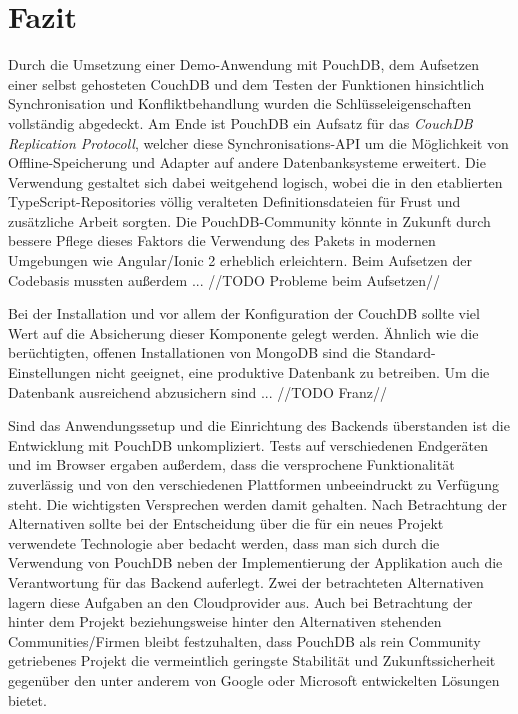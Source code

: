 \chapter{Fazit}
\label{Fazit}
Durch die Umsetzung einer Demo-Anwendung mit PouchDB, dem Aufsetzen einer selbst gehosteten CouchDB und dem Testen der Funktionen hinsichtlich Synchronisation und Konfliktbehandlung wurden die Schlüsseleigenschaften vollständig abgedeckt. Am Ende ist PouchDB ein Aufsatz für das \emph{CouchDB Replication Protocoll}, welcher diese Synchronisations-API um die Möglichkeit von Offline-Speicherung und Adapter auf andere Datenbanksysteme erweitert. Die Verwendung gestaltet sich dabei weitgehend logisch, wobei die in den etablierten TypeScript-Repositories völlig veralteten Definitionsdateien für Frust und zusätzliche Arbeit sorgten. Die PouchDB-Community könnte in Zukunft durch bessere Pflege dieses Faktors die Verwendung des Pakets in modernen Umgebungen wie Angular/Ionic 2 erheblich erleichtern. Beim Aufsetzen der Codebasis mussten außerdem ... //TODO Probleme beim Aufsetzen//

Bei der Installation und vor allem der Konfiguration der CouchDB sollte viel Wert auf die Absicherung dieser Komponente gelegt werden. Ähnlich wie die berüchtigten, offenen Installationen von MongoDB sind die Standard-Einstellungen nicht geeignet, eine produktive Datenbank zu betreiben. Um die Datenbank ausreichend abzusichern sind ... //TODO Franz//

Sind das Anwendungssetup und die Einrichtung des Backends überstanden ist die Entwicklung mit PouchDB unkompliziert. Tests auf verschiedenen Endgeräten und im Browser ergaben außerdem, dass die versprochene Funktionalität zuverlässig und von den verschiedenen Plattformen unbeeindruckt zu Verfügung steht. Die wichtigsten Versprechen werden damit gehalten.
Nach Betrachtung der Alternativen sollte bei der Entscheidung über die für ein neues Projekt verwendete Technologie aber bedacht werden, dass man sich durch die Verwendung von PouchDB neben der Implementierung der Applikation auch die Verantwortung für das Backend auferlegt. Zwei der betrachteten Alternativen lagern diese Aufgaben an den Cloudprovider aus. Auch bei Betrachtung der hinter dem Projekt beziehungsweise hinter den Alternativen stehenden Communities/Firmen bleibt festzuhalten, dass PouchDB als rein Community getriebenes Projekt die vermeintlich geringste Stabilität und Zukunftssicherheit gegenüber den unter anderem von Google oder Microsoft entwickelten Lösungen bietet.

